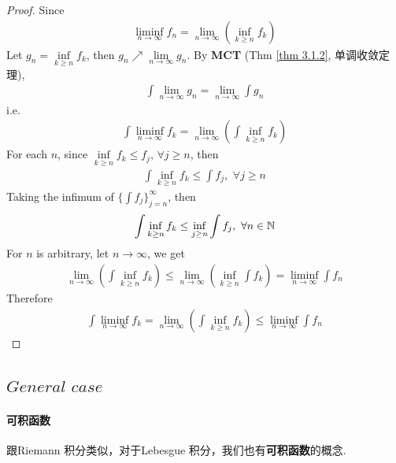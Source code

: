 \begin{thm}
 		\vspace{2em}
 		\begin{proof}
 			Since
 			\begin{align}
 				\liminf_{n \to \infty}{f_n} = \lim_{n \to \infty}{(\inf_{k \geq n}{f_k})}
 			\end{align}
 			Let $g_n = \underset{k \geq n}{\inf}{f_k}$, then $g_n \nearrow \underset{n \to \infty}{\lim}{g_n}$. By \textbf{MCT} (Thm \ref{thm 3.1.2}, 单调收敛定理),
 			\begin{align}
 				\int{\lim_{n \to \infty}{g_n}} = \lim_{n \to \infty}{\int{g_n}}
 			\end{align}
 			i.e.
 			\begin{align}
 				\int{\liminf_{n \to \infty}{f_k}} = \lim_{n \to \infty}{(\int{\inf_{k \geq n}{f_k}})}
 			\end{align}
 			For each $n$, since $\underset{k \geq n}{\inf}{f_k} \leq f_j$, $\forall j \geq n$, then
 			\begin{align}
 				\int{\inf_{k \geq n}{f_k}} \leq \int{f_j} , \,\, \forall j \geq n
 			\end{align}
 			Taking the infimum of $\{ \int{f_j} \}_{j = n}^{\infty}$, then
 			\begin{align}
 				\int{\inf_{k \geq n}{f_k}} \leq \inf_{j \geq n}{\int{f_j}} , \,\, \forall n \in \mathbb{N}
 			\end{align}
 			For $n$ is arbitrary, let $n \to \infty$, we get
 			\begin{align}
 				\lim_{n \to \infty}{(\int{\inf_{k \geq n}{f_k}})} \leq \lim_{n \to \infty}{(\inf_{k \geq n}{\int{f_k}})} = \liminf_{n \to \infty}{\int{f_n}}
 			\end{align}
 			Therefore
 			\begin{align}
 				\int{\liminf_{n \to \infty}{f_k}} = \lim_{n \to \infty}{(\int{\inf_{k \geq n}{f_k}})} \leq \liminf_{n \to \infty}{\int{f_n}}
 			\end{align}
 		\end{proof}
 	\end{thm}
 
 \newpage
 \subsection{$General \,\, case$}
 \paragraph{可积函数}
 	跟Riemann 积分类似，对于Lebesgue 积分，我们也有\textbf{可积函数}的概念.
 	
